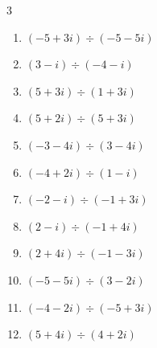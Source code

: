 \begin{multicols}{3}
\begin{enumerate}
  \item $\displaystyle (-5+3i)\div(-5-5i)$


  \item $\displaystyle (3-i)\div(-4-i)$


  \item $\displaystyle (5+3i)\div(1+3i)$


  \item $\displaystyle (5+2i)\div(5+3i)$


  \item $\displaystyle (-3-4i)\div(3-4i)$


\columnbreak %

  \item $\displaystyle (-4+2i)\div(1-i)$

        \phantom{$\displaystyle =-3-i$}

  \item $\displaystyle (-2-i)\div(-1+3i)$


  \item $\displaystyle (2-i)\div(-1+4i)$


  \item $\displaystyle (2+4i)\div(-1-3i)$


  \item $\displaystyle (-5-5i)\div(3-2i)$


  \item $\displaystyle (-4-2i)\div(-5+3i)$


  \item $\displaystyle (5+4i)\div(4+2i)$


\end{enumerate}
\end{multicols}
